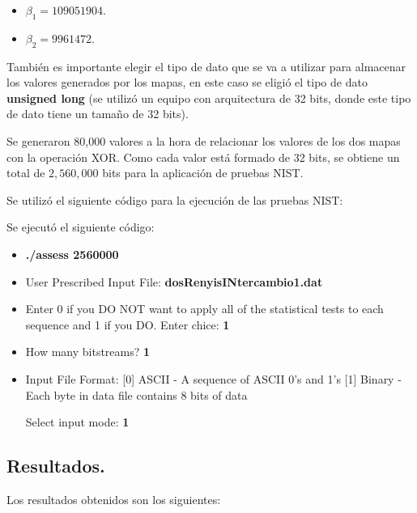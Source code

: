 \documentclass[10pt]{IEEEtran}
\begin{document}
\begin{itemize}
\item $\beta_{1}=109051904$.
\item $\beta_{2}=9961472$.
\end{itemize}



 
También es importante elegir el tipo de dato que se va a utilizar para almacenar los valores generados por los mapas, en este caso se eligió el tipo de dato \textbf{unsigned long} (se utilizó un equipo con arquitectura de 32 bits, donde este tipo de dato tiene un tamaño de 32 bits).

Se generaron 80,000 valores  a la hora de relacionar los valores de los dos mapas con la operación XOR. Como cada valor está formado de 32 bits, se  obtiene un total de $2,560,000$ bits para la aplicación de pruebas NIST.





Se utilizó el siguiente código para la ejecución de las pruebas NIST:

Se ejecutó el siguiente código:

\begin{itemize}
\item \textbf{./assess 2560000}
\item User Prescribed Input File: \textbf{dosRenyisINtercambio1.dat}
\item    Enter 0 if you DO NOT want to apply all of the
         statistical tests to each sequence and 1 if you DO. Enter chice: \textbf{1}
                  
\item  How many bitstreams? \textbf{1}

\item Input File Format:
    [0] ASCII - A sequence of ASCII 0's and 1's
    [1] Binary - Each byte in data file contains 8 bits of data

   Select input mode:  \textbf{1}
\end{itemize}

\subsection{Resultados.}
Los resultados obtenidos son los siguientes:
\end{document}
